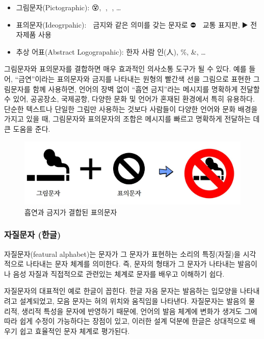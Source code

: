 \documentclass[
  letterpaper,
]{book}
\providecommand{\tightlist}{%
  \setlength{\itemsep}{0pt}\setlength{\parskip}{0pt}}\usepackage{longtable,booktabs,array}
\begin{document}
\begin{itemize}
\tightlist
\item
  그림문자(Pictographic): 😵, 🙋, 🍰, \ldots{}
\item
  표의문자(Ideogrpahic): 🚫 금지와 같은 의미를 갖는 문자로 ⛔ 🚸 교통
  표지판, ▶️ 전자제품 사용
\item
  추상 어표(Abstract Logograpahic): 한자 사람 인(人), \%, \&, \ldots{}
\end{itemize}

그림문자와 표의문자를 결합하면 매우 효과적인 의사소통 도구가 될 수 있다.
예를 들어, ``금연''이라는 표의문자와 금지를 나타내는 원형의 빨간색 선을
그림으로 표현한 그림문자를 함께 사용하면, 언어의 장벽 없이 ``흡연
금지''라는 메시지를 명확하게 전달할 수 있어, 공공장소, 국제공항, 다양한
문화 및 언어가 혼재된 환경에서 특히 유용하다. 단순한 텍스트나 단일한
그림만 사용하는 것보다 사람들이 다양한 언어와 문화 배경을 가지고 있을
때, 그림문자와 표의문자의 조합은 메시지를 빠르고 명확하게 전달하는 데 큰
도움을 준다.

\begin{figure}

{\centering \includegraphics{images/pictogram_ideogram.jpg}

}

\caption{흡연과 금지가 결합된 표의문자}

\end{figure}

\hypertarget{uxc790uxc9c8uxbb38uxc790-uxd55cuxae00}{%
\subsubsection{자질문자
(한글)}\label{uxc790uxc9c8uxbb38uxc790-uxd55cuxae00}}

자질문자(featural alphabet)는 문자가 그 문자가 표현하는 소리의
특징(자질)을 시각적으로 나타내는 문자 체계를 의미한다. 즉, 문자의 형태가
그 문자가 나타내는 발음이나 음성 자질과 직접적으로 관련있는 체계로
문자를 배우고 이해하기 쉽다.

자질문자의 대표적인 예로 한글이 꼽힌다. 한글 자음 문자는 발음하는
입모양을 나타내려고 설계되었고, 모음 문자는 혀의 위치와 움직임을
나타낸다. 자질문자는 발음의 물리적, 생리적 특성을 문자에 반영하기
때문에, 언어의 발음 체계에 변화가 생겨도 그에 따라 쉽게 수정이
가능하다는 장점이 있고, 이러한 설계 덕분에 한글은 상대적으로 배우기 쉽고
효율적인 문자 체계로 평가된다.
\end{document}
